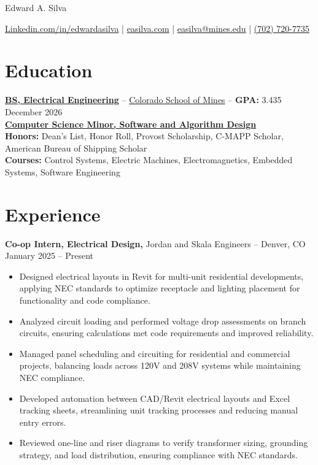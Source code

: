 \documentclass[11pt]{article}       %
\begin{document}
\centerline{\huge Edward A. Silva}
\vspace{5pt}

\centerline{
\href{https://www.linkedin.com/in/edwardasilva/}{Linkedin.com/in/edwardasilva}
| \href{https://easilva.com}{easilva.com}
| \href{mailto:easilva@mines.edu}{easilva@mines.edu} 
| \href{tel:7027207735}{(702) 720-7735}
}

\vspace{-18pt}
\section*{Education}
\textbf{\href{https://electrical.mines.edu/undergraduate-program/}{BS, Electrical Engineering}} -- \href{https://www.mines.edu/}{Colorado School of Mines} -- \textbf{GPA:} 3.435 \hfill December 2026 \\
\textbf{\href{https://cs.mines.edu/csmines-minors-and-areas-of-special-interest/}{Computer Science Minor, Software and Algorithm Design}}\\

\textbf{Honors:} Dean's List, Honor Roll, Provost Scholarship, C-MAPP Scholar, American Bureau of Shipping Scholar \\ 
\textbf{Courses:} Control Systems, Electric Machines, Electromagnetics, Embedded Systems, Software Engineering
\vspace{-14pt}

\section*{Experience}

\textbf{Co-op Intern, Electrical Design, }{Jordan and Skala Engineers} -- Denver, CO \hfill January 2025 -- Present \\
\vspace{-6.5pt}
\begin{itemize}
  \item Designed electrical layouts in Revit for multi-unit residential developments, applying NEC standards to optimize receptacle and lighting placement for functionality and code compliance.
  \item Analyzed circuit loading and performed voltage drop assessments on branch circuits, ensuring calculations met code requirements and improved reliability.
  \item Managed panel scheduling and circuiting for residential and commercial projects, balancing loads across 120V and 208V systems while maintaining NEC compliance.
  \item Developed automation between CAD/Revit electrical layouts and Excel tracking sheets, streamlining unit tracking processes and reducing manual entry errors.
  \item Reviewed one-line and riser diagrams to verify transformer sizing, grounding strategy, and load distribution, ensuring compliance with NEC standards.
\end{itemize}
\end{document}

